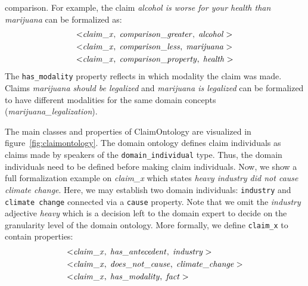 comparison. For example, the claim \emph{alcohol is worse for your health than marijuana} can
be formalized as:
\begin{align*}
	< & \mathit{claim\_x}, \hspace{0.1cm} \mathit{comparison\_greater}, \hspace{0.1cm}
	\mathit{alcohol} > \\
	< & \mathit{claim\_x}, \hspace{0.1cm} \mathit{comparison\_less}, \hspace{0.1cm}
	\mathit{marijuana} >  \\
	< & \mathit{claim\_x}, \hspace{0.1cm} \mathit{comparison\_property}, \hspace{0.1cm}
	\mathit{health} > 
\end{align*}
The \texttt{has\_modality} property reflects in which modality the claim was made. 
Claims \emph{marijuana should be legalized} and \emph{marijuana is legalized} 
can be formalized to have different modalities for the same domain concepts
(\emph{marijuana\_legalization}). 

The main classes and properties of ClaimOntology are visualized in 
figure~\ref{fig:claimontology}. The domain ontology defines 
claim individuals as claims made by speakers of the
\texttt{domain\_individual} type. Thus, the domain individuals need to be
defined before making claim individuals. Now, we show a full formalization 
example on \emph{claim\_x} which states
\emph{heavy industry did not cause climate change}. Here, we may establish
two domain individuals: \texttt{industry} and \texttt{climate change}
connected via a \texttt{cause} property. Note that we omit the \emph{industry}
adjective \emph{heavy} which is a decision left to the domain expert to decide
on the granularity level of the domain ontology. 
More formally, we define \texttt{claim\_x} to contain properties:
\begin{align*}
	< & \mathit{claim\_x}, \hspace{0.1cm} \mathit{has\_antecedent}, \hspace{0.1cm}
	\mathit{industry} > \\
	< & \mathit{claim\_x}, \hspace{0.1cm} \mathit{does\_not\_cause}, \hspace{0.1cm}
	\mathit{climate\_change} >  \\
	< & \mathit{claim\_x}, \hspace{0.1cm} \mathit{has\_modality}, \hspace{0.1cm}
	\mathit{fact} > 
\end{align*}

